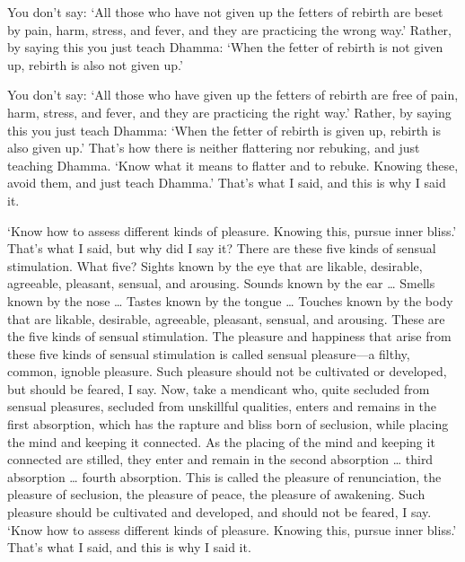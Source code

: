 \documentclass[12pt,openany]{book}%
\begin{document}
You don’t say: ‘All those who have not given up the fetters of rebirth are beset by pain, harm, stress, and fever, and they are practicing the wrong way.’ Rather, by saying this you just teach Dhamma: ‘When the fetter of rebirth is not given up, rebirth is also not given up.’ 

You don’t say: ‘All those who have given up the fetters of rebirth are free of pain, harm, stress, and fever, and they are practicing the right way.’ Rather, by saying this you just teach Dhamma: ‘When the fetter of rebirth is given up, rebirth is also given up.’ That’s how there is neither flattering nor rebuking, and just teaching Dhamma. ‘Know what it means to flatter and to rebuke. Knowing these, avoid them, and just teach Dhamma.’ That’s what I said, and this is why I said it. 

‘Know how to assess different kinds of pleasure. Knowing this, pursue inner bliss.’ That’s what I said, but why did I say it? There are these five kinds of sensual stimulation. What five? Sights known by the eye that are likable, desirable, agreeable, pleasant, sensual, and arousing. Sounds known by the ear … Smells known by the nose … Tastes known by the tongue … Touches known by the body that are likable, desirable, agreeable, pleasant, sensual, and arousing. These are the five kinds of sensual stimulation. The pleasure and happiness that arise from these five kinds of sensual stimulation is called sensual pleasure—a filthy, common, ignoble pleasure. Such pleasure should not be cultivated or developed, but should be feared, I say. Now, take a mendicant who, quite secluded from sensual pleasures, secluded from unskillful qualities, enters and remains in the first absorption, which has the rapture and bliss born of seclusion, while placing the mind and keeping it connected. As the placing of the mind and keeping it connected are stilled, they enter and remain in the second absorption … third absorption … fourth absorption. This is called the pleasure of renunciation, the pleasure of seclusion, the pleasure of peace, the pleasure of awakening. Such pleasure should be cultivated and developed, and should not be feared, I say. ‘Know how to assess different kinds of pleasure. Knowing this, pursue inner bliss.’ That’s what I said, and this is why I said it. 
\end{document}
